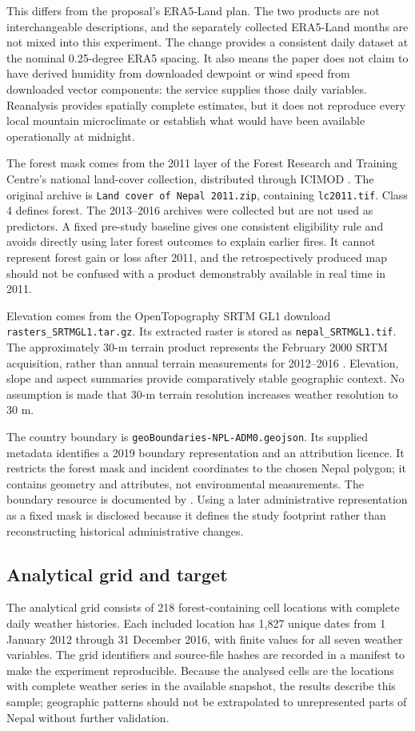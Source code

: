 \documentclass[conference,a4paper]{IEEEtran}
\begin{document}
This differs from the proposal's ERA5-Land plan. The two products are not interchangeable descriptions, and the separately collected ERA5-Land months are not mixed into this experiment. The change provides a consistent daily dataset at the nominal 0.25-degree ERA5 spacing. It also means the paper does not claim to have derived humidity from downloaded dewpoint or wind speed from downloaded vector components: the service supplies those daily variables. Reanalysis provides spatially complete estimates, but it does not reproduce every local mountain microclimate or establish what would have been available operationally at midnight.

The forest mask comes from the 2011 layer of the Forest Research and Training Centre's national land-cover collection, distributed through ICIMOD \citep{frtc}. The original archive is \texttt{Land cover of Nepal 2011.zip}, containing \texttt{lc2011.tif}. Class 4 defines forest. The 2013--2016 archives were collected but are not used as predictors. A fixed pre-study baseline gives one consistent eligibility rule and avoids directly using later forest outcomes to explain earlier fires. It cannot represent forest gain or loss after 2011, and the retrospectively produced map should not be confused with a product demonstrably available in real time in 2011.

Elevation comes from the OpenTopography SRTM GL1 download \texttt{rasters\_SRTMGL1.tar.gz}. Its extracted raster is stored as \texttt{nepal\_SRTMGL1.tif}. The approximately 30-m terrain product represents the February 2000 SRTM acquisition, rather than annual terrain measurements for 2012--2016 \citep{srtm}. Elevation, slope and aspect summaries provide comparatively stable geographic context. No assumption is made that 30-m terrain resolution increases weather resolution to 30 m.

The country boundary is \texttt{geoBoundaries-NPL-ADM0.geojson}. Its supplied metadata identifies a 2019 boundary representation and an attribution licence. It restricts the forest mask and incident coordinates to the chosen Nepal polygon; it contains geometry and attributes, not environmental measurements. The boundary resource is documented by \citet{runfola}. Using a later administrative representation as a fixed mask is disclosed because it defines the study footprint rather than reconstructing historical administrative changes.

\subsection{Analytical grid and target}
The analytical grid consists of 218 forest-containing cell locations with complete daily weather histories. Each included location has 1,827 unique dates from 1 January 2012 through 31 December 2016, with finite values for all seven weather variables. The grid identifiers and source-file hashes are recorded in a manifest to make the experiment reproducible. Because the analysed cells are the locations with complete weather series in the available snapshot, the results describe this sample; geographic patterns should not be extrapolated to unrepresented parts of Nepal without further validation.
\end{document}
